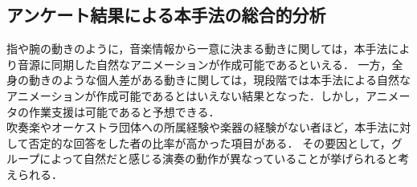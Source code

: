 \subsection{アンケート結果による本手法の総合的分析}
指や腕の動きのように，音楽情報から一意に決まる動きに関しては，本手法により音源に同期した自然なアニメーションが作成可能であるといえる．
一方，全身の動きのような個人差がある動きに関しては，現段階では本手法による自然なアニメーションが作成可能であるとはいえない結果となった．しかし，アニメータの作業支援は可能であると予想できる．\\
\indent
吹奏楽やオーケストラ団体への所属経験や楽器の経験がない者ほど，本手法に対して否定的な回答をした者の比率が高かった項目がある．
その要因として，グループによって自然だと感じる演奏の動作が異なっていることが挙げられると考えられる．